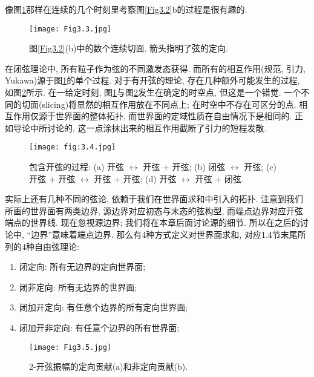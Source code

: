 像图\ref{Fig3.3}那样在连续的几个时刻里考察图\ref{Fig3.2}b的过程是很有趣的.
\begin{figure}
	\begin{center}
		\texttt{[image: Fig3.3.jpg]}\\
\caption{图\ref{Fig3.2}(b)中的数个连续切面. 箭头指明了弦的定向.}\label{Fig3.3}
	\end{center}
\end{figure}
在闭弦理论中, 所有粒子作为弦的不同激发态获得. 而所有的相互作用(规范, 引力, Yukawa)源于图\ref{Fig3.3}的单个过程. 对于有开弦的理论, 存在几种额外可能发生的过程, 如图\ref{fig:3.4}所示. 在一给定时刻, 图\ref{Fig3.3}与图\ref{fig:3.4}发生在确定的时空点, 但这是一个错觉. 一个不同的切面(slicing)将显然的相互作用放在不同点上; 在时空中不存在可区分的点. 相互作用仅源于世界面的整体拓扑, 而世界面的定域性质在自由情况下是相同的. 正如导论中所讨论的, 这一点涂抹出来的相互作用截断了引力的短程发散. 
\vspace{0.5cm}
\begin{figure}[h]
	\begin{center}
		\texttt{[image: fig:3.4.jpg]}\\
\caption{包含开弦的过程: (a) 开弦 $\leftrightarrow$ 开弦 $+$ 开弦; (b) 闭弦 $\leftrightarrow$ 开弦; (c) 开弦 $+$ 开弦 $\leftrightarrow$ 开弦 $+$ 开弦; (d) 开弦 $\leftrightarrow$ 开弦 $+$ 闭弦.}\label{fig:3.4}
	\end{center}
\end{figure}

实际上还有几种不同的弦论, 依赖于我们在世界面求和中引入的拓扑. 注意到我们所画的世界面有两类边界, 源边界对应初态与末态的弦构型, 而端点边界对应开弦端点的世界线. 现在忽视源边界; 我们将在本章后面讨论源的细节. 所以在之后的讨论中, “边界”意味着端点边界. 那么有4种方式定义对世界面求和, 对应1.4节末尾所列的4种自由弦理论:
\begin{enumerate}
	\item 闭定向: 所有无边界的定向世界面; 
	\item 闭非定向: 所有无边界的世界面; 
	\item 闭加开定向: 有任意个边界的所有定向世界面; 
	\item 闭加开非定向: 有任意个边界的所有世界面; 
\end{enumerate} 


\begin{figure}[h]
	\begin{center}
		\texttt{[image: Fig3.5.jpg]}\\
\caption{2-开弦振幅的定向贡献(a)和非定向贡献(b).}\label{Fig3.5}
	\end{center}
\end{figure}


